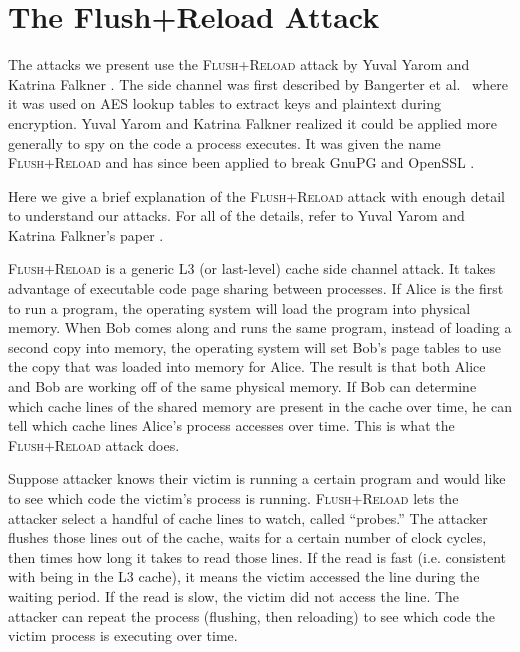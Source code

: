 \documentclass{acm_proc_article-sp}
\begin{document}
\section{The Flush+Reload Attack}

The attacks we present use the \textsc{Flush+Reload} attack by Yuval Yarom and
Katrina Falkner \cite{yarom2013flush}. The side channel was first described by
Bangerter et al.\ \cite{gullasch2011cache} where it was used on AES lookup
tables to extract keys and plaintext during encryption. Yuval Yarom and Katrina
Falkner realized it could be applied more generally to spy on the code a process
executes. It was given the name \textsc{Flush+Reload} and has since been applied
to break GnuPG \cite{yarom2013flush} and OpenSSL \cite{benger2014ooh,
yarom2014recovering}.

Here we give a brief explanation of the \textsc{Flush+Reload} attack with enough detail
to understand our attacks. For all of the details, refer to Yuval Yarom and
Katrina Falkner's paper \cite{yarom2013flush}.

\textsc{Flush+Reload} is a generic L3 (or last-level) cache side channel attack. It takes
advantage of executable code page sharing between processes. If Alice is the
first to run a program, the operating system will load the program into physical
memory. When Bob comes along and runs the same program, instead of loading
a second copy into memory, the operating system will set Bob's page tables to
use the copy that was loaded into memory for Alice. The result is that both
Alice and Bob are working off of the same physical memory. If Bob can determine
which cache lines of the shared memory are present in the cache over time, he
can tell which cache lines Alice's process accesses over time. This is what the
\textsc{Flush+Reload} attack does.

Suppose attacker knows their victim is running a certain program and would like
to see which code the victim's process is running. \textsc{Flush+Reload} lets
the attacker select a handful of cache lines to watch, called ``probes.'' The
attacker flushes those lines out of the cache, waits for a certain number of
clock cycles, then times how long it takes to read those lines. If the read is
fast (i.e. consistent with being in the L3 cache), it means the victim accessed
the line during the waiting period. If the read is slow, the victim did not
access the line. The attacker can repeat the process (flushing, then reloading)
to see which code the victim process is executing over time.
\end{document}
